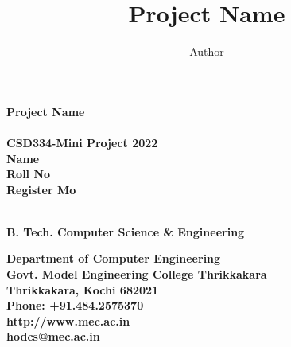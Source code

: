 \documentclass[11pt]{report}
\begin{document}
\renewcommand\bibname{References}
\pagestyle{fancy}
\fancyfoot{}
\fancyfoot[c]{\thepage}
\renewcommand{\chaptermark}[1]{
\markboth{\thechapter.\ #1}{}} 
\renewcommand{\headrulewidth}{0.1pt}
\fancyhead[r]{\slshape \leftmark}
\addtolength{\headheight}{\baselineskip}

\lhead{\nouppercase{\rightmark}}
\rhead{\nouppercase{\leftmark}}
%
\title {Project Name}
\author {Author}

\begin{titlepage}
\begin{center}

\Huge{\textbf{Project Name}}\\
\large{\textbf{\\CSD334-Mini Project 2022\\}}
\vspace{1.2in}
\Large{\textbf{Name}}\\ 
\Large{\textbf{Roll No\\
Register Mo\\
}}	\hspace{.1in}	

\Large{\textbf{
\\B. Tech. Computer Science \& Engineering
}}


\vspace{.6in}
\begin{figure}[h]
\begin{center}
\end{center}
\end{figure}
\textbf{
Department of Computer Engineering\\
Govt. Model Engineering College Thrikkakara\\
Thrikkakara, Kochi 682021\\
Phone: +91.484.2575370\\
http://www.mec.ac.in \\
hodcs@mec.ac.in
}
\end{center}
\end{titlepage}
\end{document}
